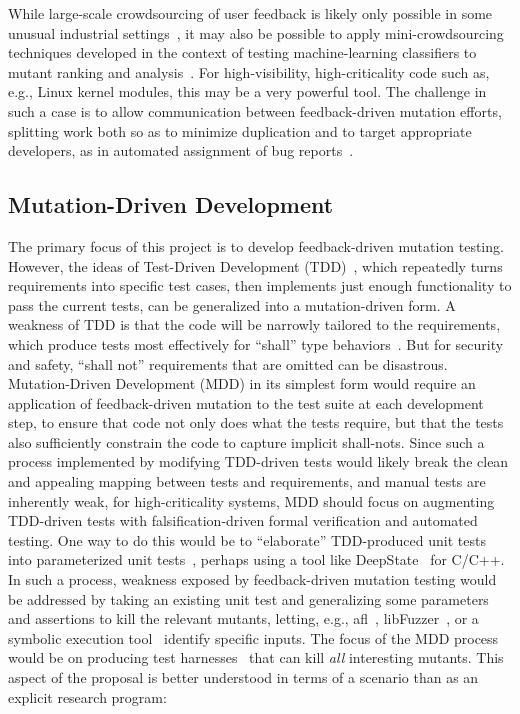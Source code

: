 While large-scale crowdsourcing of user feedback is likely only
possible in some unusual industrial
settings~\cite{MutGoogle,ivankovic2018industrial}, it may also be
possible to apply mini-crowdsourcing techniques developed in the
context of testing machine-learning classifiers to mutant ranking and
analysis~\cite{Minicrowd}.  For high-visibility, high-criticality code
such as, e.g., Linux kernel modules, this may be a very powerful
tool.  The challenge in such a case is to allow communication between
feedback-driven mutation efforts, splitting work both so as to
minimize duplication and to target appropriate developers, as in automated assignment of
bug reports~\cite{bhattacharya2012automated,jonsson2016automated}.


\subsection{Mutation-Driven Development}

The primary focus of this project is to develop feedback-driven mutation
testing.  However, the ideas of Test-Driven Development
(TDD)~\cite{TDD,TDDFuture}, which repeatedly turns requirements into specific
test cases, then implements just enough functionality to pass the current tests,
can be generalized into a mutation-driven form.  A weakness of TDD is that the code will be narrowly tailored to the
requirements, which produce tests most effectively for ``shall''
type behaviors~\cite{INCOSE}.  But for security and
safety, ``shall not'' requirements that are omitted can be disastrous.
Mutation-Driven Development (MDD) in its simplest form would require an
application of feedback-driven mutation to the test suite at each development
step, to ensure that code not only does what the tests require, but that the
tests also sufficiently constrain the code to capture implicit shall-nots.
Since such a process implemented by modifying TDD-driven tests would likely
break the clean and appealing mapping between tests and requirements, and manual
tests are inherently weak, for high-criticality systems, MDD should focus on
augmenting TDD-driven tests with falsification-driven formal verification and
automated testing.  One way to do this would be to ``elaborate'' TDD-produced
unit tests into parameterized unit tests~\cite{UnitMeister,ParamUnit}, perhaps
using a tool like DeepState~\cite{DeepState} for C/C++.  In such a process,
weakness exposed by feedback-driven mutation testing would be addressed by
taking an existing unit test and generalizing some parameters and assertions to
kill the relevant mutants, letting, e.g., afl~\cite{aflfuzz},
libFuzzer~\cite{libfuzzer}, or a symbolic execution
tool~\cite{angr1,angr2,manticore} identify specific inputs.  The focus of the
MDD process would be on producing test harnesses~\cite{WODACommon,tstlsttt} that
can kill \emph{all} interesting mutants.  This aspect of the proposal
is better understood in terms of a scenario than as an explicit
research program:

